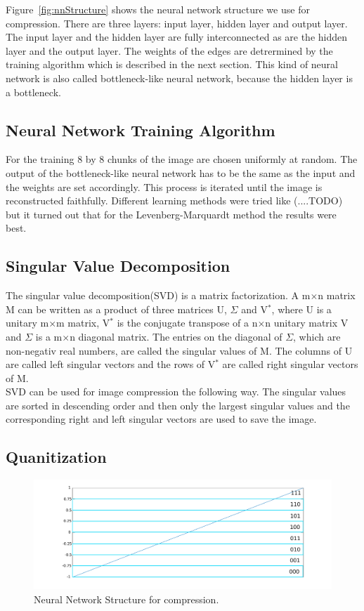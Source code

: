 Figure~\ref{fig:nnStructure} shows the neural network structure we use for compression. There are three layers: input layer, hidden layer and output layer. The input layer and the hidden layer are fully interconnected as are the hidden layer and the output layer. The weights of the edges are detrermined by the training algorithm which is described in the next section. This kind of neural network is also called bottleneck-like neural network, because the hidden layer is a bottleneck.

\subsection{Neural Network Training Algorithm}
For the training 8 by 8 chunks of the image are chosen uniformly at random. The output of the bottleneck-like neural network has to be the same as the input and the weights are set accordingly. This process is iterated until the image is reconstructed faithfully.  
Different learning methods were tried like (....TODO) but it turned out that for the Levenberg-Marquardt method the results were best. 
\subsection{Singular Value Decomposition}
The singular value decomposition(SVD) is a matrix factorization. A m$\times$n matrix M can be written as a product of three matrices U, $\Sigma$ and V$^*$, where U is a unitary m$\times$m matrix, V$^*$ is the conjugate transpose of a n$\times$n unitary matrix V and $\Sigma$ is a m$\times$n diagonal matrix. The entries on the diagonal of $\Sigma$, which are non-negativ real numbers, are called the singular values of M. The columns of U are called left singular vectors and the rows of V$^*$ are called right singular vectors of M. \\
SVD can be used for image compression the following way. The singular values are sorted in descending order and then only the largest singular values and the corresponding right and left singular vectors are used to save the image.

\subsection{Quanitization}
\label{sec:quanitization}
\begin{figure}[tbp]
  \centering
  \includegraphics[width=\columnwidth]{images/bqQuantizer}
  \caption{Neural Network Structure for compression.}
  \label{fig:bpQuantizer}
\end{figure}


